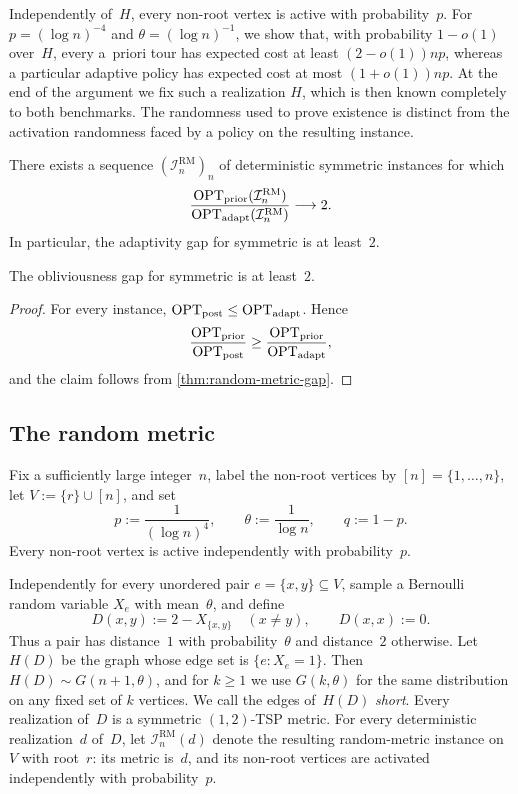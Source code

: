 \documentclass[12pt,a4paper,oneside]{report}
\begin{document}
Independently of~$H$, every non-root vertex is active with probability~$p$.
For $p=(\log n)^{-4}$ and $\theta=(\log n)^{-1}$, we show that, with probability
$1-o(1)$ over~$H$, every a~priori tour has expected cost at least
$(2-o(1))np$, whereas a particular adaptive policy has expected cost at most
$(1+o(1))np$.
At the end of the argument we fix such a realization $H$, which is then known completely
to both benchmarks.  The randomness used to prove existence is distinct from
the activation randomness faced by a policy on the resulting instance.

\begin{theorem}
\label{thm:random-metric-gap}
There exists a sequence $(\mathcal{I}_n^{\mathrm{RM}})_n$ of deterministic
symmetric \StochTSP{} instances
for which
\[
    \frac{\operatorname{OPT}_\mathrm{prior}(\mathcal{I}_n^{\mathrm{RM}})}
         {\operatorname{OPT}_\mathrm{adapt}(\mathcal{I}_n^{\mathrm{RM}})}
    \longrightarrow 2.
\]
In particular, the adaptivity gap for symmetric \StochTSP{} is at
least~$2$.
\end{theorem}

\begin{corollary}\label{cor:random-metric-oblivious}
The obliviousness gap for symmetric \StochTSP{} is at least~$2$.
\end{corollary}

\begin{proof}
For every instance, $\operatorname{OPT}_\mathrm{post}\le\operatorname{OPT}_\mathrm{adapt}$.  Hence
\[
    \frac{\operatorname{OPT}_\mathrm{prior}}{\operatorname{OPT}_\mathrm{post}}
    \ge
    \frac{\operatorname{OPT}_\mathrm{prior}}{\operatorname{OPT}_\mathrm{adapt}},
\]
and the claim follows from \cref{thm:random-metric-gap}.
\end{proof}

\subsection{The random metric}\label{sec:random-metric-model}

Fix a sufficiently large integer~$n$, label the non-root
vertices by $[n]=\{1,\ldots,n\}$, let $V:=\{r\}\cup[n]$, and set
\[
    p:=\frac{1}{(\log n)^4},
    \qquad
    \theta:=\frac{1}{\log n},
    \qquad
    q:=1-p.
\]
Every non-root vertex is active independently with probability~$p$.

Independently for every unordered pair
$e=\{x,y\}\subseteq V$, sample a Bernoulli random variable
$X_e$ with mean~$\theta$, and define
\[
    D(x,y):=2-X_{\{x,y\}}
    \quad (x\neq y),
    \qquad
    D(x,x):=0.
\]
Thus a pair has distance~$1$ with probability~$\theta$ and distance~$2$
otherwise.  Let $H(D)$ be the graph whose edge set is
$\{e:X_e=1\}$.  Then $H(D)\sim G(n+1,\theta)$, and for $k\ge1$ we use
$G(k,\theta)$ for the same distribution on any fixed set of $k$ vertices.
We call the edges of~$H(D)$ \emph{short}.  Every realization of~$D$ is a
symmetric $(1,2)$-TSP metric.
For every deterministic realization~$d$ of~$D$, let
$\mathcal{I}_n^{\mathrm{RM}}(d)$ denote the resulting random-metric
\StochTSP{} instance on~$V$ with root~$r$: its metric is~$d$, and its
non-root vertices are activated independently with probability~$p$.
\end{document}
